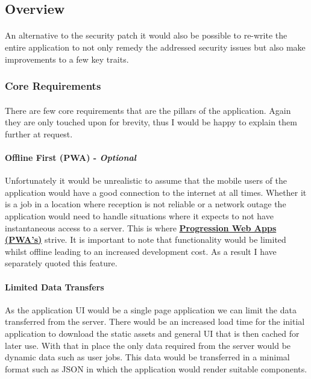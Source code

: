 \subsection{Overview}\label{subsec:overview}
\paragraph{}
An alternative to the security patch it would also be possible to re-write the entire application to not only remedy the addressed
security issues but also make improvements to a few key traits.

\subsubsection{Core Requirements}\label{subsubsec:core-goals}
\paragraph{}
There are few core requirements that are the pillars of the application.
Again they are only touched upon for brevity, thus I would be happy to explain them further at request.

\paragraph{Offline First (PWA) - \emph{Optional}}\label{para:pwa}
Unfortunately it would be unrealistic to assume that the mobile users of the application would have a good connection to the internet at all times.
Whether it is a job in a location where reception is not reliable or a network outage the application would need to handle situations where
it expects to not have instantaneous access to a server.
This is where \href{https://web.dev/progressive-web-apps/}{\textbf{Progression Web Apps (PWA's)}} strive.
It is important to note that functionality would be limited whilst offline leading to an increased development cost.
As a result I have separately quoted this feature.

\paragraph{Limited Data Transfers}
As the application UI would be a single page application we can limit the data transferred from the server.
There would be an increased load time for the initial application to download the static assets and general UI that is then cached for
later use.
With that in place the only data required from the server would be dynamic data such as user jobs.
This data would be transferred in a minimal format such as JSON in which the application would render suitable components.

